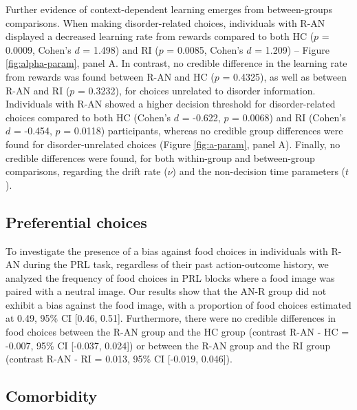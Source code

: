 \documentclass[
  man,floatsintext]{apa6}
\begin{document}
Further evidence of context-dependent learning emerges from between-groups comparisons. When making disorder-related choices, individuals with R-AN displayed a decreased learning rate from rewards compared to both HC (\(p\) = 0.0009, Cohen's \(d\) = 1.498) and RI (\(p\) = 0.0085, Cohen's \(d\) = 1.209) -- Figure \ref{fig:alpha-param}, panel A. In contrast, no credible difference in the learning rate from rewards was found between R-AN and HC (\(p\) = 0.4325), as well as between R-AN and RI (\(p\) = 0.3232), for choices unrelated to disorder information. Individuals with R-AN showed a higher decision threshold for disorder-related choices compared to both HC (Cohen's \(d\) = -0.622, \(p\) = 0.0068) and RI (Cohen's \(d\) = -0.454, \(p\) = 0.0118) participants, whereas no credible group differences were found for disorder-unrelated choices (Figure \ref{fig:a-param}, panel A). Finally, no credible differences were found, for both within-group and between-group comparisons, regarding the drift rate (\(\nu\)) and the non-decision time parameters (\(t\)).

\hypertarget{preferential-choices}{%
\subsection{Preferential choices}\label{preferential-choices}}

To investigate the presence of a bias against food choices in individuals with R-AN during the PRL task, regardless of their past action-outcome history, we analyzed the frequency of food choices in PRL blocks where a food image was paired with a neutral image. Our results show that the AN-R group did not exhibit a bias against the food image, with a proportion of food choices estimated at 0.49, 95\% CI {[}0.46, 0.51{]}. Furthermore, there were no credible differences in food choices between the R-AN group and the HC group (contrast R-AN - HC = -0.007, 95\% CI {[}-0.037, 0.024{]}) or between the R-AN group and the RI group (contrast R-AN - RI = 0.013, 95\% CI {[}-0.019, 0.046{]}).

\hypertarget{comorbidity}{%
\subsection{Comorbidity}\label{comorbidity}}
\end{document}
